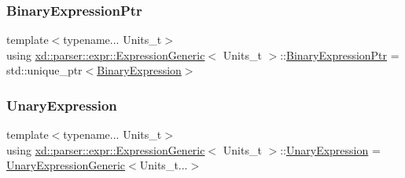 \subsubsection{\texorpdfstring{Binary\+Expression\+Ptr}{BinaryExpressionPtr}}
{\footnotesize\ttfamily template$<$typename... Units\+\_\+t$>$ \\
using \mbox{\hyperlink{structxd_1_1parser_1_1expr_1_1_expression_generic}{xd\+::parser\+::expr\+::\+Expression\+Generic}}$<$ Units\+\_\+t $>$\+::\mbox{\hyperlink{structxd_1_1parser_1_1expr_1_1_expression_generic_af3290b56362f6bc7ca516b947905c42c}{Binary\+Expression\+Ptr}} =  std\+::unique\+\_\+ptr$<$\mbox{\hyperlink{structxd_1_1parser_1_1expr_1_1_expression_generic_a2bc00be3a5e572a1bee429bcda5943d8}{Binary\+Expression}}$>$}

\mbox{\label{structxd_1_1parser_1_1expr_1_1_expression_generic_a8cca2ad1a4cf5a6e05d9bcc1c440c184}} 
\subsubsection{\texorpdfstring{Unary\+Expression}{UnaryExpression}}
{\footnotesize\ttfamily template$<$typename... Units\+\_\+t$>$ \\
using \mbox{\hyperlink{structxd_1_1parser_1_1expr_1_1_expression_generic}{xd\+::parser\+::expr\+::\+Expression\+Generic}}$<$ Units\+\_\+t $>$\+::\mbox{\hyperlink{structxd_1_1parser_1_1expr_1_1_expression_generic_a8cca2ad1a4cf5a6e05d9bcc1c440c184}{Unary\+Expression}} =  \mbox{\hyperlink{structxd_1_1parser_1_1expr_1_1_unary_expression_generic}{Unary\+Expression\+Generic}}$<$Units\+\_\+t...$>$}

\mbox{\label{structxd_1_1parser_1_1expr_1_1_expression_generic_ae516fdc68d9578b128200311c23e7feb}} 
